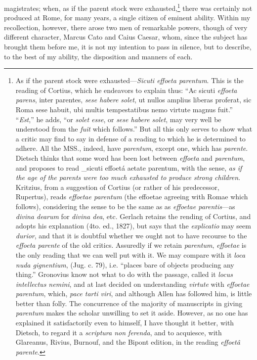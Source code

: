 magistrates; when, as if the parent stock were exhausted,\footnote{As if the parent stock were exhausted—\emph{Sicuti effoeta
parentum}. This is the reading of Cortius, which he endeavors to
explain thus: ``Ac sicuti \emph{effoeta parens}, inter parentes, \emph{sese
habere solet}, ut nullos amplius liberas proferat, sic Roma sese
habuit, ubi multis tempestatibus nemo virtute magnus fuit.'' ``\emph{Est},''
he adds, ``or \emph{solet esse}, or \emph{sese habere solet}, may very well be
understood from the \emph{fuit} which follows.'' But all this only serves to
show what a critic may find to say in defense of a reading to which he
is determined to adhere. All the MSS., indeed, have \emph{parentum}, except
one, which has \emph{parente}. Dietsch thinks that some word has been lost
between \emph{effoeta} and \emph{parentum}, and proposes to read \_sicuti effoetá
aetate parentum, with the sense, \emph{as if the age of the parents were
too much exhausted to produce strong children}. Kritzius, from a
suggestion of Cortius (or rather of his predecessor, Rupertus), reads
\emph{effoetae parentum} (the effoetae agreeing with Romae which follows),
considering the sense to be the same as as \emph{effoetae parentis}—as
\emph{divina dearum} for \emph{divina dea}, etc. Gerlach retains the rending of
Cortius, and adopts his explanation (4to. ed., 1827), but says that
the \emph{explicatio} may seem \emph{durior}, and that it is doubtful whether we
ought not to have recourse to the \emph{effoeta parente} of the old critics.
Assuredly if we retain \emph{parentum}, \emph{effoetae} is the only reading that
we can well put with it. We may compare with it \emph{loca nuda gignentium},
(Jug. c. 79), i.e. ``places bare of objects producing any thing.''
Gronovius know not what to do with the passage, called it \emph{locus
intellectus nemini}, and at last decided on understanding \emph{virtute}
with \emph{effoetae parentum}, which, \emph{pace tarti viri}, and although Allen
has followed him, is little better than folly. The concurrence of the
majority of manuscripts in giving \emph{parentum} makes the scholar
unwilling to set it aside. However, as no one has explained it
satisfactorily even to himself, I have thought it better, with Dietsch,
to regard it a \emph{scriptura non ferenda}, and to acquiesce, with
Glareanus, Rivius, Burnouf, and the Bipont edition, in the reading
\emph{effoetâ parente}.} there
was certainly not produced at Rome, for many years, a single citizen
of eminent ability. Within my recollection, however, there arose two
men of remarkable powers, though of very different character, Marcus
Cato and Caius Caesar, whom, since the subject has brought them before
me, it is not my intention to pass in silence, but to describe, to the
best of my ability, the disposition and manners of each.

